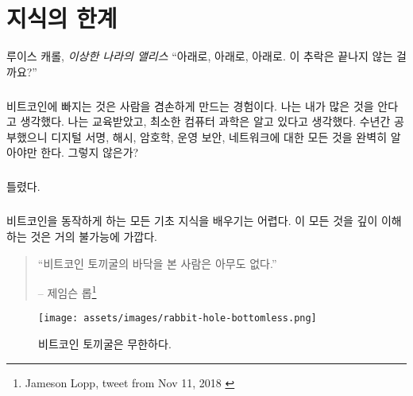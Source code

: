 \chapter{지식의 한계}
\label{les:7}

\begin{chapquote}{루이스 캐롤, \textit{이상한 나라의 앨리스}}
	\enquote{아래로, 아래로, 아래로. 이 추락은 끝나지 않는 걸까요?}
\end{chapquote}

\paragraph{}
비트코인에 빠지는 것은 사람을 겸손하게 만드는 경험이다. 
나는 내가 많은 것을 안다고 생각했다. 
나는 교육받았고, 최소한 컴퓨터 과학은 알고 있다고 생각했다. 
수년간 공부했으니 디지털 서명, 해시, 암호학, 운영 보안, 네트워크에 대한 모든 것을 완벽히 알아야만 한다. 그렇지 않은가?

\paragraph{}
틀렸다.

\paragraph{}
비트코인을 동작하게 하는 모든 기초 지식을 배우기는 어렵다. 
이 모든 것을 깊이 이해하는 것은 거의 불가능에 가깝다.

\begin{quotation}\begin{samepage}
		\enquote{비트코인 토끼굴의 바닥을 본 사람은 아무도 없다.}
		\begin{flushright} -- 제임슨 롭\footnote{Jameson Lopp, tweet from Nov 11, 2018 \cite{lopp-tweet}}
\end{flushright}\end{samepage}\end{quotation}

\begin{figure}
	\centering
	\texttt{[image: assets/images/rabbit-hole-bottomless.png]}
	\caption{비트코인 토끼굴은 무한하다.}
	\label{fig:rabbit-hole-bottomless}
\end{figure}

